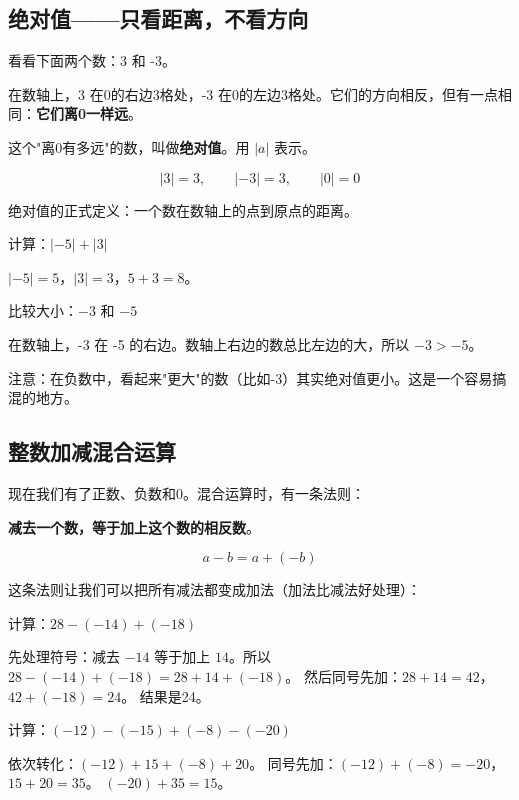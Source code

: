 \subsection*{绝对值——只看距离，不看方向}

看看下面两个数：3 和 -3。

在数轴上，3 在0的右边3格处，-3 在0的左边3格处。它们的方向相反，但有一点相同：\textbf{它们离0一样远}。

这个"离0有多远"的数，叫做\textbf{绝对值}。用 $|a|$ 表示。

\[
|3| = 3,\qquad |-3| = 3,\qquad |0| = 0
\]

绝对值的正式定义：一个数在数轴上的点到原点的距离。

\begin{example}
计算：$|-5|+|3|$
\end{example}
\begin{solution}
$|-5|=5$，$|3|=3$，$5+3=8$。
\end{solution}

\begin{example}
比较大小：$-3$ 和 $-5$
\end{example}
\begin{solution}
在数轴上，-3 在 -5 的右边。数轴上右边的数总比左边的大，所以 $-3 > -5$。

注意：在负数中，看起来"更大"的数（比如-3）其实绝对值更小。这是一个容易搞混的地方。
\end{solution}

\subsection*{整数加减混合运算}

现在我们有了正数、负数和0。混合运算时，有一条法则：

\textbf{减去一个数，等于加上这个数的相反数}。

\[
a - b = a + (-b)
\]

这条法则让我们可以把所有减法都变成加法（加法比减法好处理）：

\begin{example}
计算：$28-(-14)+(-18)$
\end{example}
\begin{solution}
先处理符号：减去 $-14$ 等于加上 $14$。所以
$28-(-14)+(-18) = 28+14+(-18)$。
然后同号先加：$28+14=42$，$42+(-18)=24$。
结果是24。
\end{solution}

\begin{example}
计算：$(-12)-(-15)+(-8)-(-20)$
\end{example}
\begin{solution}
依次转化：$(-12)+15+(-8)+20$。
同号先加：$(-12)+(-8) = -20$，$15+20=35$。
$(-20)+35 = 15$。
\end{solution}

